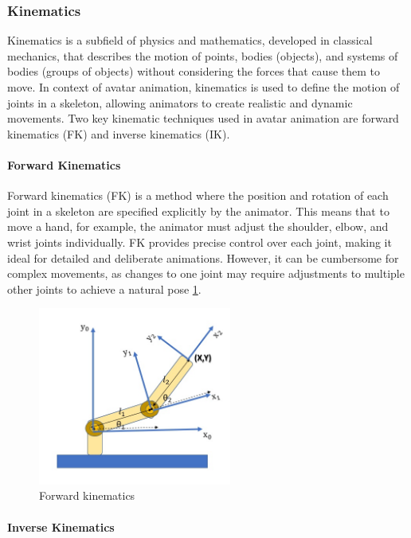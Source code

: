 \subsubsection{Kinematics}

Kinematics is a subfield of physics and mathematics, developed in classical mechanics, that describes the motion of points, bodies (objects), and systems of bodies (groups of objects) without considering the forces that cause them to move. In context of avatar animation, kinematics is used to define the motion of joints in a skeleton, allowing animators to create realistic and dynamic movements. Two key kinematic techniques used in avatar animation are forward kinematics (FK) and inverse kinematics (IK).

\paragraph{Forward Kinematics}

Forward kinematics (FK) is a method where the position and rotation of each joint in a skeleton are specified explicitly by the animator. This means that to move a hand, for example, the animator must adjust the shoulder, elbow, and wrist joints individually. FK provides precise control over each joint, making it ideal for detailed and deliberate animations. However, it can be cumbersome for complex movements, as changes to one joint may require adjustments to multiple other joints to achieve a natural pose \ref{fig:forward_kinematics_example}.

\begin{figure}
  \centering \includegraphics[width = 2.5in]{images/background_work/forward_kinematics_example.png}
  \caption{Forward kinematics}
  \label{fig:forward_kinematics_example}
\end{figure}

\paragraph{Inverse Kinematics}


